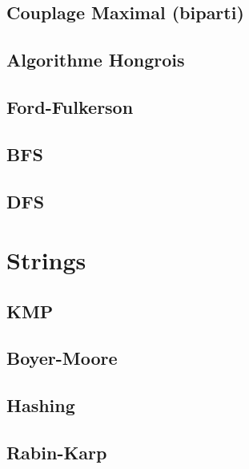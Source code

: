 \documentclass[10pt]{article}
\begin{document}
\subsection{Couplage Maximal (biparti)}
{\scriptsize}

\subsection{Algorithme Hongrois}
{\scriptsize}

\subsection{Ford-Fulkerson}
{\scriptsize}

\subsection{BFS}
{\scriptsize}

\subsection{DFS}
{\scriptsize}


\section{Strings}
\subsection{KMP}
{\scriptsize}

\subsection{Boyer-Moore}
{\scriptsize}

\subsection{Hashing}
{\scriptsize}

\subsection{Rabin-Karp}
{\scriptsize}
\end{document}
